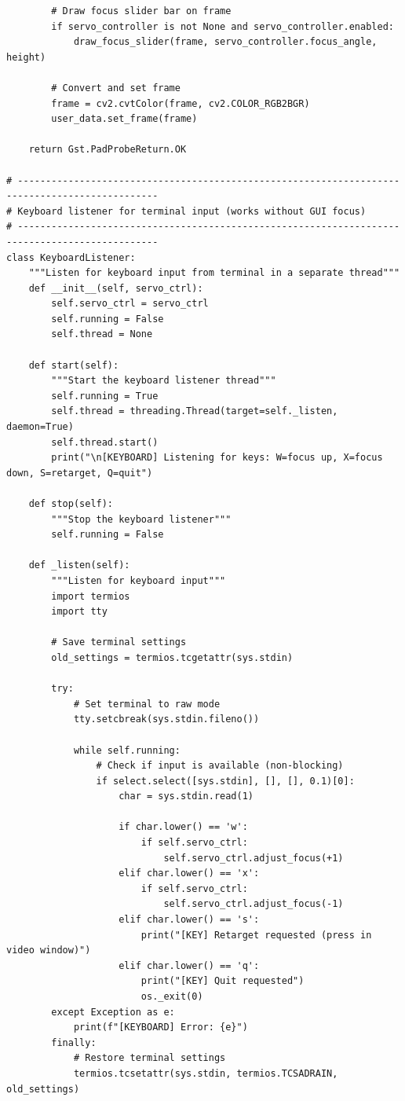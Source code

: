 \documentclass[11pt,a4paper]{article}
\begin{document}
\begin{lstlisting}
        # Draw focus slider bar on frame
        if servo_controller is not None and servo_controller.enabled:
            draw_focus_slider(frame, servo_controller.focus_angle, height)
        
        # Convert and set frame
        frame = cv2.cvtColor(frame, cv2.COLOR_RGB2BGR)
        user_data.set_frame(frame)
    
    return Gst.PadProbeReturn.OK

# -----------------------------------------------------------------------------------------------
# Keyboard listener for terminal input (works without GUI focus)
# -----------------------------------------------------------------------------------------------
class KeyboardListener:
    """Listen for keyboard input from terminal in a separate thread"""
    def __init__(self, servo_ctrl):
        self.servo_ctrl = servo_ctrl
        self.running = False
        self.thread = None
    
    def start(self):
        """Start the keyboard listener thread"""
        self.running = True
        self.thread = threading.Thread(target=self._listen, daemon=True)
        self.thread.start()
        print("\n[KEYBOARD] Listening for keys: W=focus up, X=focus down, S=retarget, Q=quit")
    
    def stop(self):
        """Stop the keyboard listener"""
        self.running = False
    
    def _listen(self):
        """Listen for keyboard input"""
        import termios
        import tty
        
        # Save terminal settings
        old_settings = termios.tcgetattr(sys.stdin)
        
        try:
            # Set terminal to raw mode
            tty.setcbreak(sys.stdin.fileno())
            
            while self.running:
                # Check if input is available (non-blocking)
                if select.select([sys.stdin], [], [], 0.1)[0]:
                    char = sys.stdin.read(1)
                    
                    if char.lower() == 'w':
                        if self.servo_ctrl:
                            self.servo_ctrl.adjust_focus(+1)
                    elif char.lower() == 'x':
                        if self.servo_ctrl:
                            self.servo_ctrl.adjust_focus(-1)
                    elif char.lower() == 's':
                        print("[KEY] Retarget requested (press in video window)")
                    elif char.lower() == 'q':
                        print("[KEY] Quit requested")
                        os._exit(0)
        except Exception as e:
            print(f"[KEYBOARD] Error: {e}")
        finally:
            # Restore terminal settings
            termios.tcsetattr(sys.stdin, termios.TCSADRAIN, old_settings)


\end{lstlisting}
\end{document}
